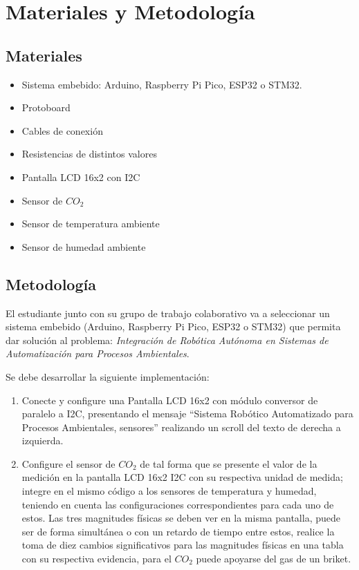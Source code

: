 \section{Materiales y Metodología}

\subsection{Materiales}

\begin{itemize}
	\item Sistema embebido: Arduino, Raspberry Pi Pico, ESP32 o STM32.
	\item Protoboard
	\item Cables de conexión
	\item Resistencias de distintos valores
	\item Pantalla LCD 16x2 con I2C
	\item Sensor de $CO_2$
	\item Sensor de temperatura ambiente 
	\item Sensor de humedad ambiente
\end{itemize}

\subsection{Metodología}

El estudiante junto con su grupo de trabajo colaborativo va a seleccionar un sistema embebido (Arduino, Raspberry Pi Pico, ESP32 o STM32) que permita dar solución al problema: \textit{Integración de Robótica Autónoma en Sistemas de Automatización para Procesos Ambientales}.

Se debe desarrollar la siguiente implementación:
\begin{enumerate}
	\item Conecte y configure una Pantalla LCD 16x2 con módulo conversor de paralelo a I2C, presentando el mensaje ``Sistema Robótico Automatizado para Procesos Ambientales, sensores'' realizando un scroll del texto de derecha a izquierda. 
	\item Configure el sensor de $CO_2$ de tal forma que se presente el valor de la medición en la pantalla
	LCD 16x2 I2C con su respectiva unidad de medida; integre en el mismo código a los sensores de 
	temperatura y humedad, teniendo en cuenta las configuraciones correspondientes para cada uno de estos. 
	Las tres magnitudes físicas se deben ver en la misma pantalla, puede ser de forma simultánea o con un 
	retardo de tiempo entre estos, realice la toma de diez cambios significativos para las magnitudes 
	físicas en una tabla con su respectiva evidencia, para el $CO_2$ puede apoyarse del gas de un briket.
\end{enumerate}
